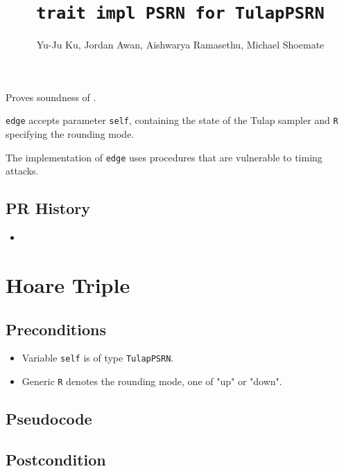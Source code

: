 \documentclass{article}
\title{\texttt{trait impl PSRN for TulapPSRN}}
\author{Yu-Ju Ku, Jordan Awan, Aishwarya Ramasethu, Michael Shoemate}
\begin{document}
\maketitle

\contrib

Proves soundness of .

\texttt{edge} accepts parameter \texttt{self}, containing the state of the Tulap sampler and \texttt{R} specifying the rounding mode.
\floatingPoint

\begin{tcolorbox}
    \begin{warning}
        The implementation of \texttt{edge} uses procedures that are vulnerable to timing attacks. 
    \end{warning}
\end{tcolorbox}

\subsection*{PR History}
\begin{itemize}
    \item {}
\end{itemize}

\section{Hoare Triple}

\subsection*{Preconditions}
\begin{itemize}
    \item Variable \texttt{self} is of type \texttt{TulapPSRN}.
    \item Generic \texttt{R} denotes the rounding mode, one of "up" or "down".
\end{itemize}

\subsection*{Pseudocode}



\subsection*{Postcondition}
\end{document}
